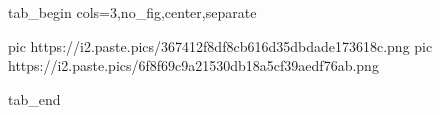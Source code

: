  
 
 
 
 


\ifcmt
  tab_begin cols=3,no_fig,center,separate

     pic https://i2.paste.pics/367412f8df8cb616d35dbdade173618c.png
		 pic https://i2.paste.pics/6f8f69c9a21530db18a5cf39aedf76ab.png

  tab_end
\fi
